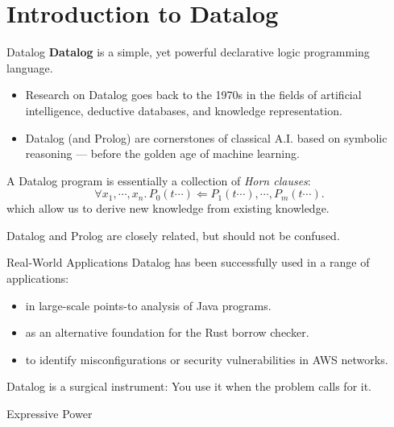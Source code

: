 \section{Introduction to Datalog}

\begin{frame}{Datalog}
\textbf{Datalog} is a simple, yet powerful declarative logic programming language.
\begin{itemize}
    \pause \item Research on Datalog goes back to the 1970s in the fields of artificial
    intelligence, deductive databases, and knowledge representation.
    \pause \item Datalog (and Prolog) are cornerstones of classical A.I. based on
    symbolic reasoning --- before the golden age of machine learning.
\end{itemize}

\pause

A Datalog program is essentially a collection of \emph{Horn clauses}:
%
$$
\forall x_1, \cdots, x_n. \, P_0(t \cdots) \Leftarrow P_1(t \cdots), \cdots, P_m(t \cdots).
$$
which allow us to derive new knowledge from existing knowledge.

\pause

Datalog and Prolog are closely related, but should not be confused.
\end{frame}

\begin{frame}{Real-World Applications}
Datalog has been successfully used in a range of applications:

\begin{itemize}
    \item in large-scale points-to analysis of Java programs.
    \item as an alternative foundation for the Rust borrow checker.
    \item to identify misconfigurations or security vulnerabilities in AWS networks.
\end{itemize}

\pause

Datalog is a surgical instrument: You use it when the problem calls for it. 
\end{frame}

\begin{frame}{Expressive Power}
\centering
\medskip
\medskip
{}
\end{frame}

